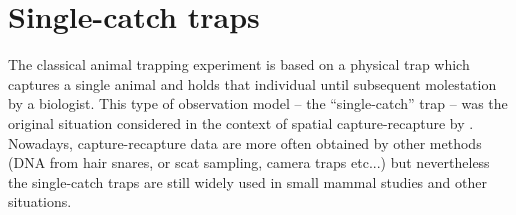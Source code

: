 \section{Single-catch traps}
\label{poisson-mn.sec.singlecatch}

The classical animal trapping experiment is based on a physical trap
which captures a single animal and holds that individual until
subsequent molestation by a biologist.  This type of observation model
-- the ``single-catch'' trap -- was the original situation considered
in the context of spatial capture-recapture by
\citet{efford:2004}. Nowadays, capture-recapture data are more often
obtained by other methods (DNA from hair snares, or scat sampling,
camera traps etc...) but nevertheless the single-catch traps are still
widely used in small mammal studies \citep{converse_etal:2006ea,
  converse_royle:2012} and other situations.

